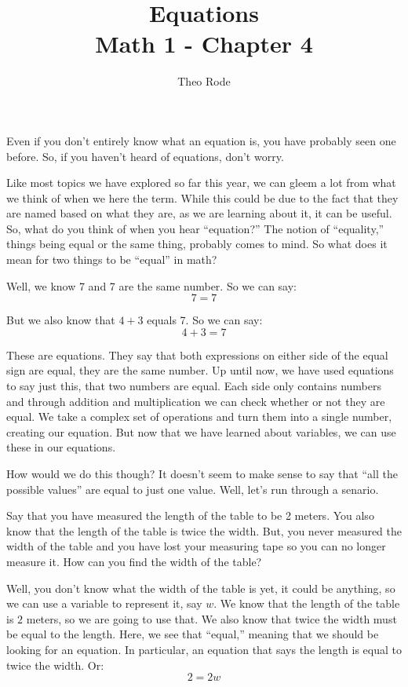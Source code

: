 \documentclass{article}
\title{\textbf{Equations} \\ \large Math 1 - Chapter 4}
\author{Theo Rode}
\date{}
\begin{document}
\maketitle
Even if you don't entirely know what an equation is, you have probably seen one before. So, if you haven't heard of equations, don't worry. 

Like most topics we have explored so far this year, we can gleem a lot from what we think of when we here the term. While this could be due to the fact that they are named based on what they are, as we are learning about it, it can be useful. 
So, what do you think of when you hear ``equation?'' The notion of ``equality,'' things being equal or the same thing, probably comes to mind. So what does it mean for two things to be ``equal'' in math? 

Well, we know 7 and 7 are the same number. So we can say: 
\[ 7 = 7 \]

But we also know that $4+3$ equals 7. So we can say: 
\[ 4 + 3 = 7 \]

These are equations. They say that both expressions on either side of the equal sign are equal, they are the same number. 
Up until now, we have used equations to say just this, that two numbers are equal. Each side only contains numbers and through addition and multiplication we can check whether or not they are equal. We take a complex set of operations and turn them into a single number, creating our equation. But now that we have learned about variables, we can use these in our equations. 

How would we do this though? It doesn't seem to make sense to say that ``all the possible values'' are equal to just one value. Well, let's run through a senario. 

Say that you have measured the length of the table to be 2 meters. You also know that the length of the table is twice the width. But, you never measured the width of the table and you have lost your measuring tape so you can no longer measure it. How can you find the width of the table? 

Well, you don't know what the width of the table is yet, it could be anything, so we can use a variable to represent it, say $w$. 
We know that the length of the table is $2$ meters, so we are going to use that. We also know that twice the width must be equal to the length. 
Here, we see that ``equal,'' meaning that we should be looking for an equation. In particular, an equation that says the length is equal to twice the width. Or: 
\[ 2 = 2w \]
\end{document}
